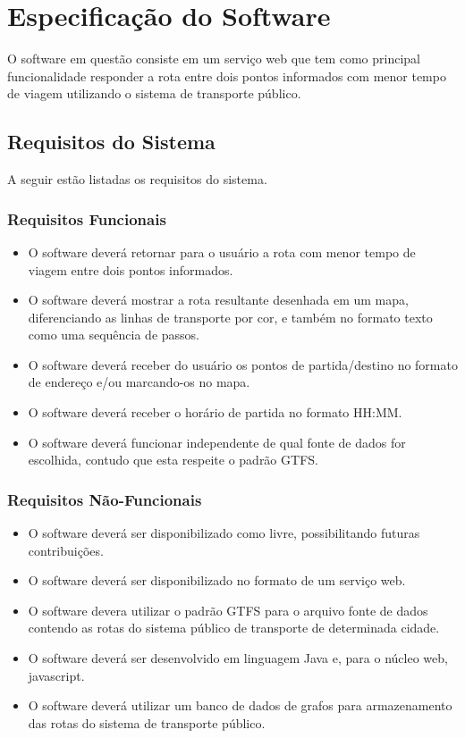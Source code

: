 
\chapter{Especificação do Software}
O software em questão consiste em um serviço web que tem como principal funcionalidade responder a rota entre dois pontos informados com menor tempo de viagem utilizando o sistema de transporte público.

\section{Requisitos do Sistema}
A seguir estão listadas os requisitos do sistema.

\subsection{Requisitos Funcionais}
\begin{itemize}
	\item O software deverá retornar para o usuário a rota com menor tempo de viagem entre dois pontos informados.
	\item O software deverá mostrar a rota resultante desenhada em um mapa, diferenciando as linhas de transporte por cor, e também no formato texto como uma sequência de passos.
	\item O software deverá receber do usuário os pontos de partida/destino no formato de endereço e/ou marcando-os no mapa.
	\item O software deverá receber o horário de partida no formato HH:MM.
	\item O software deverá funcionar independente de qual fonte de dados for escolhida, contudo que esta respeite o padrão GTFS.
\end{itemize}

\subsection{Requisitos Não-Funcionais}
\begin{itemize}
	\item O software deverá ser disponibilizado como livre, possibilitando futuras contribuições.
	\item O software deverá ser disponibilizado no formato de um serviço web.
	\item O software devera utilizar o padrão GTFS para o arquivo fonte de dados contendo as rotas do sistema público de transporte de determinada cidade.
	\item O software deverá ser desenvolvido em linguagem Java e, para o núcleo web, javascript.
	\item O software deverá utilizar um banco de dados de grafos para armazenamento das rotas do sistema de transporte público.
\end{itemize}

